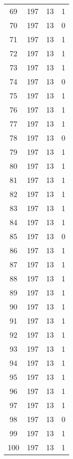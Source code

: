 \begin{longtable}[!]{c|ccc}
	69	& 197	& 13	& 1	\\
	70	& 197	& 13	& 0	\\
	71	& 197	& 13	& 1	\\
	72	& 197	& 13	& 1	\\
	73	& 197	& 13	& 1	\\
	74	& 197	& 13	& 0	\\
	75	& 197	& 13	& 1	\\
	76	& 197	& 13	& 1	\\
	77	& 197	& 13	& 1	\\
	78	& 197	& 13	& 0	\\
	79	& 197	& 13	& 1	\\
	80	& 197	& 13	& 1	\\
	81	& 197	& 13	& 1	\\
	82	& 197	& 13	& 1	\\
	83	& 197	& 13	& 1	\\
	84	& 197	& 13	& 1	\\
	85	& 197	& 13	& 0	\\
	86	& 197	& 13	& 1	\\
	87	& 197	& 13	& 1	\\
	88	& 197	& 13	& 1	\\
	89	& 197	& 13	& 1	\\
	90	& 197	& 13	& 1	\\
	91	& 197	& 13	& 1	\\
	92	& 197	& 13	& 1	\\
	93	& 197	& 13	& 1	\\
	94	& 197	& 13	& 1	\\
	95	& 197	& 13	& 1	\\
	96	& 197	& 13	& 1	\\
	97	& 197	& 13	& 1	\\
	98	& 197	& 13	& 0	\\
	99	& 197	& 13	& 1	\\
	100	& 197	& 13	& 1	\\
\end{longtable}


